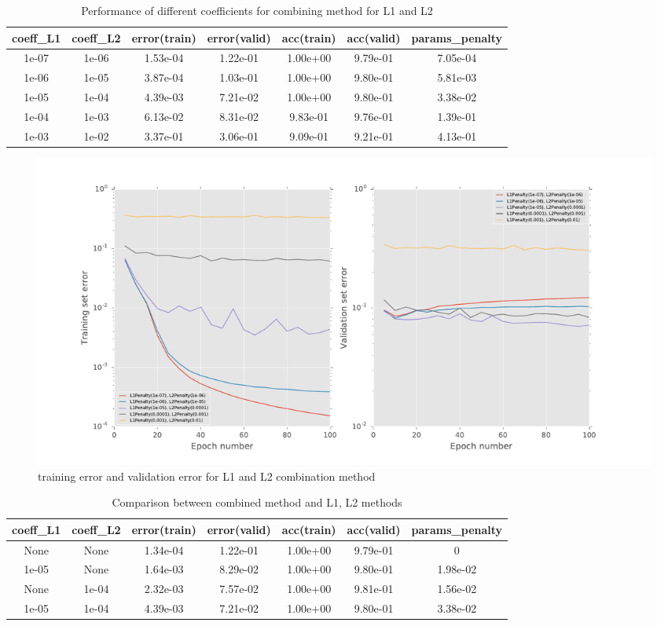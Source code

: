 \documentclass[11pt]{article}
\begin{document}
\begin{table}
\begin{center}
\begin{tabular}{ c  c c c c  c c} 
\hline
coeff\_L1 & coeff\_L2 &error(train) & error(valid) & acc(train) & acc(valid) & params\_penalty\\
\hline
\hline
1e-07& 1e-06	&1.53e-04 & 1.22e-01 & 1.00e+00 & 9.79e-01 &7.05e-04\\ 
1e-06 & 1e-05  	&3.87e-04 & 1.03e-01 & 1.00e+00 & 9.80e-01 &5.81e-03\\ 
1e-05 &1e-04	 &4.39e-03 & 7.21e-02 & 1.00e+00 & 9.80e-01 &3.38e-02\\ 
1e-04 & 1e-03 & 6.13e-02  &  8.31e-02  &  9.83e-01 & 9.76e-01  &  1.39e-01\\
1e-03 & 1e-02 &3.37e-01&  3.06e-01   & 9.09e-01 & 9.21e-01 &4.13e-01\\
\end{tabular}
\caption{Performance of different coefficients for combining method for L1 and L2}
\label{tb:L1_L2_combine}
\end{center}	
\end{table}

\begin{figure}[h]
\centering 
  \includegraphics[width=1\textwidth]{L1_L2.pdf}
  \caption{training error and validation error for L1 and L2 combination method}
  \label{fg:L1_L2_combine}
\end{figure}

\begin{table}[htp]
\begin{center}
\begin{tabular}{ c  c c c c  c c} 
\hline
coeff\_L1 & coeff\_L2 &error(train) & error(valid) & acc(train) & acc(valid) & params\_penalty\\
\hline
\hline
None & None	&1.34e-04 & 1.22e-01 & 1.00e+00 & 9.79e-01 &0\\ 
1e-05 & None 	&1.64e-03 & 8.29e-02 & 1.00e+00 & 9.80e-01 &1.98e-02\\ 
None &1e-04	 &2.32e-03 & 7.57e-02 & 1.00e+00 & 9.81e-01 &1.56e-02\\ 
1e-05 &1e-04	 &4.39e-03 & 7.21e-02 & 1.00e+00 & 9.80e-01 &3.38e-02\\ 
\end{tabular}
\caption{Comparison between combined method and L1, L2 methods}
\label{tb:L1_L2_combine}
\end{center}	
\end{table}
\end{document}
